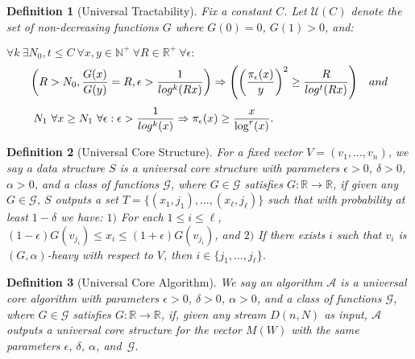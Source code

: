 \documentclass[11pt]{article}
\newtheorem{defn}{Definition}
\begin{document}
\begin{defn}[Universal Tractability]\label{defn:utractability}
Fix a constant $C$.  Let $\mathcal{U}(C)$ denote the set of non-decreasing functions $G$ where $G(0) = 0$,
$G(1) > 0$, and:

\vspace{1mm}
$\forall k \ \exists N_0,t \leq C \ \forall x,y \in \mathbb{N^+} \ \forall R \in \mathbb{R^+} \ \forall \epsilon:$
\vspace{-4mm}
\begin{equation}
\left(R > N_0, \frac{G(x)}{G(y)} = R, \epsilon > \frac{1}{log^k(Rx)} \right) \Rightarrow \left( \left(\frac{\pi_\epsilon(x)}{y}\right)^2 \geq \frac{R}{log^t(Rx)} \right) \hspace{3mm} and
\end{equation}
\vspace{-2mm}
\begin{equation}
\hspace{-2.049in}\forall k \ \exists r \leq C,N_1 \ \forall x \geq N_1 \ \forall \epsilon : \epsilon > \frac{1}{log^k(x)} \Rightarrow \pi_\epsilon(x) \geq \frac{x}{\log^r(x)}. \\
\end{equation}

\end{defn}

\begin{defn}[Universal Core Structure]\label{defn:ucs}
For a fixed vector $V = (v_1,\ldots,v_n)$, we say a data structure $S$ is a universal core structure with
parameters $\epsilon > 0$, $\delta > 0$, $\alpha > 0$, and a class of functions $\mathcal{G}$,
where $G \in \mathcal{G}$
satisfies $G:\mathbb{R} \rightarrow \mathbb{R}$, if given any $G \in \mathcal{G}$, $S$ outputs a set
$T = \{(x_1,j_1),\ldots,(x_\ell,j_\ell)\}$ such that with probability at least $1-\delta$ we have:
$1)$ For each $1 \leq i \leq \ell$, $(1-\epsilon)G(v_{j_i}) \leq x_i \leq (1+\epsilon)G(v_{j_i})$, and
$2)$ If there exists $i$ such that $v_i$ is $(G,\alpha)$-heavy with respect to $V$, then
$i \in \{j_1,\ldots,j_\ell\}$.
\end{defn}

\begin{defn}[Universal Core Algorithm]\label{defn:uca}
We say an algorithm $\mathcal{A}$ is a universal core algorithm with parameters $\epsilon > 0$, $\delta > 0$,
$\alpha > 0$,
and a class of functions $\mathcal{G}$, where $G \in \mathcal{G}$
satisfies $G:\mathbb{R} \rightarrow \mathbb{R}$, if, given any stream $D(n,N)$ as input,
$\mathcal{A}$ outputs a universal core structure for the vector $M(W)$ with the same parameters
$\epsilon$, $\delta$, $\alpha$, and~$\mathcal{G}$.
\end{defn}
\end{document}
